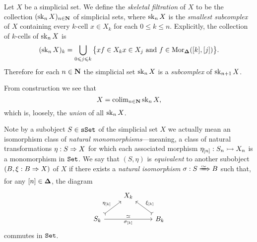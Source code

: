 \begin{definition}
\label{def:skeletal-filtration-sset}
Let \(X\) be a simplicial set. We define the \emph{skeletal filtration} of \(X\)
to be the collection \((\operatorname{sk}_n X)_{n \in \mathbf{N}}\) of simplicial sets, where
\(\operatorname{sk}_n X\) is the \emph{smallest subcomplex} of \(X\) containing every
\(k\)-cell \(x \in X_k\) for each \(0 \leq k \leq n\). Explicitly, the
collection of \(k\)-cells of \(\operatorname{sk}_n X\) is
\[
(\operatorname{sk}_n X)_k = \bigcup_{0 \leqslant j \leqslant k}
\big\{ x f \in X_k
\relax x \in X_j
\text{ and }
f \in \operatorname{Mor}_{{\mathbf{\Delta}}}([k], [j])\big\}.
\]
Therefore for each \(n \in \mathbf{N}\) the simplicial set \(\operatorname{sk}_n X\) is a
\emph{subcomplex} of \(\operatorname{sk}_{n+1} X\).

From construction we see that
\[
X = \operatorname{colim}_{n \in \mathbf{N}} \operatorname{sk}_n X,
\]
which is, loosely, the \emph{union} of all \(\operatorname{sk}_n X\).
\end{definition}

\begin{remark}
\label{rem:on-the-skeletal-filtration-of-a-sset}
Note by a subobject \(S \in {\texttt{sSet}}\) of the simplicial set \(X\) we actually
mean an isomorphism class of \emph{natural monomorphisms}---meaning, a class of
natural transformations \(\eta: S \Rightarrow X\) for which each associated morphism
\(\eta_{[n]}: S_n \rightarrowtail X_n\) is a monomorphism in \({\texttt{Set}}\). We say that
\((S, \eta)\) is \emph{equivalent} to another subobject \((B, \xi: B \Rightarrow X)\)
of \(X\) if there exists a \emph{natural isomorphism} \(\sigma: S \isonat B\)
such that, for any \([n] \in {\mathbf{\Delta}}\), the diagram
\[
\begin{tikzcd}
&X_k &
\\
S_k \ar[ru, tail, "\eta_{[k]}"]
\ar[rr, "\dis", "\sigma_{[k]}"']
&
&B_k \ar[lu, tail, "\xi_{[k]}"']
\end{tikzcd}
\]
commutes in \({\texttt{Set}}\).
\end{remark}

